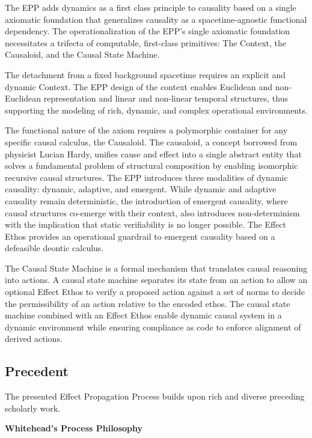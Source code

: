 The EPP adds dynamics as a first class principle to causality based on a single axiomatic foundation that generalizes causality as a spacetime-agnostic functional dependency. The operationalization of the EPP's single axiomatic foundation necessitates a trifecta of computable, first-class primitives: The Context, the Causaloid, and the Causal State Machine.

 The detachment from a fixed background spacetime requires an explicit and dynamic Context. The EPP design of the context enables Euclidean and non-Euclidean representation and linear and non-linear temporal structures, thus supporting the modeling of rich, dynamic, and complex operational environments.

The functional nature of the axiom requires a polymorphic container for any specific causal calculus, the Causaloid. The causaloid, a concept borrowed from physicist Lucian Hardy, unifies cause and effect into a single abstract entity that solves a fundamental problem of structural composition by enabling isomorphic recursive causal structures. The EPP introduces three modalities of dynamic causality: dynamic, adaptive, and emergent. While dynamic and adaptive causality remain deterministic, the introduction of emergent causality, where causal structures co-emerge with their context, also introduces non-determinism with the implication that static verifiability is no longer possible. The Effect Ethos provides an operational guardrail to emergent causality based on a defeasible deontic calculus.

The Causal State Machine is a formal mechanism that translates causal reasoning into actions. A causal state machine separates its state from an action to allow an optional Effect Ethos to verify a proposed action against a set of norms to decide the permissibility of an action relative to the encoded ethos. The causal state machine combined with an Effect Ethos enable dynamic causal system in a dynamic environment while ensuring compliance as code to enforce alignment of derived actions.

\subsection{Precedent}

The presented Effect Propagation Process builds upon rich and diverse preceding scholarly work. 

\textbf{Whitehead's Process Philosophy}


